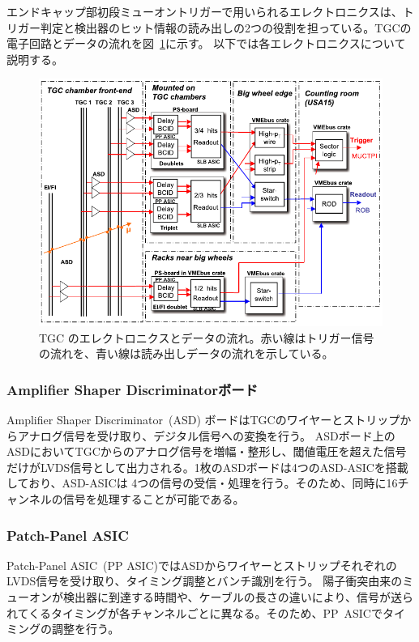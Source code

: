 エンドキャップ部初段ミューオントリガーで用いられるエレクトロニクスは、トリガー判定と検出器のヒット情報の読み出しの2つの役割を担っている。TGCの電子回路とデータの流れを図~\ref{fig:TGC_electro}に示す。
以下では各エレクトロニクスについて説明する。

\begin{figure}[tb]
  \centering
  \includegraphics[clip, width=14cm]{fig/3/electronics.pdf}
  \caption{TGC のエレクトロニクスとデータの流れ\cite{Aad:1129811}。赤い線はトリガー信号の流れを、青い線は読み出しデータの流れを示している。}
  \label{fig:TGC_electro}
\end{figure}

\subsubsection{Amplifier Shaper Discriminatorボード}
Amplifier Shaper Discriminator~(ASD) ボードはTGCのワイヤーとストリップからアナログ信号を受け取り、デジタル信号への変換を行う。
ASDボード上のASDにおいてTGCからのアナログ信号を増幅・整形し、閾値電圧を超えた信号だけがLVDS信号として出力される。1枚のASDボードは4つのASD-ASICを搭載しており、ASD-ASICは 4つの信号の受信・処理を行う。そのため、同時に16チャンネルの信号を処理することが可能である。

\subsubsection{Patch-Panel ASIC}
Patch-Panel ASIC~(PP ASIC)ではASDからワイヤーとストリップそれぞれのLVDS信号を受け取り、タイミング調整とバンチ識別を行う。
陽子衝突由来のミューオンが検出器に到達する時間や、ケーブルの長さの違いにより、信号が送られてくるタイミングが各チャンネルごとに異なる。そのため、PP~ASICでタイミングの調整を行う。

